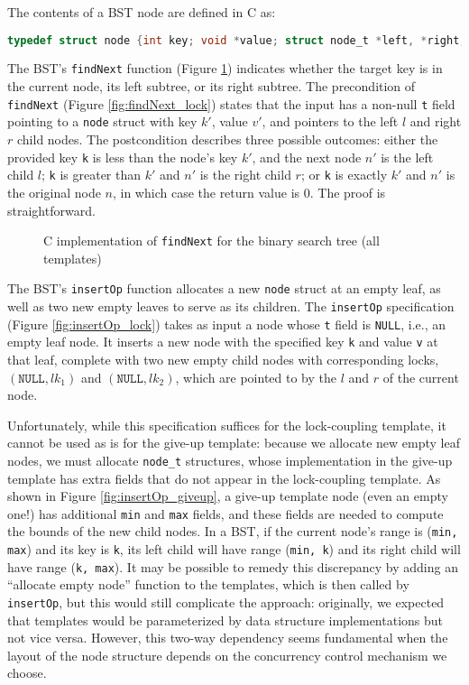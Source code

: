 \documentclass[a4paper,UKenglish,cleveref, autoref, thm-restate]{lipics-v2021}
\begin{document}
The contents of a BST node are defined in C as:
\begin{lstlisting}[language = C, backgroundcolor=\color{white}, basicstyle=\ttfamily\footnotesize]
	typedef struct node {int key; void *value; struct node_t *left, *right;} node;
\end{lstlisting}
The BST's \lstinline{findNext} function (Figure \ref{findnext}) indicates whether the target key is in the current node, its left subtree, or its right subtree. The precondition of \texttt{findNext} (Figure \ref*{fig:findNext_lock}) states that the input has a non-null \texttt{t} field pointing to a \texttt{node} struct with key $k'$, value $v'$, and pointers to the left $l$ and right $r$ child nodes. The postcondition describes three possible outcomes: either the provided key \texttt{k} is less than the node's key $k'$, and the next node $n'$ is the left child $l$; \lstinline{k} is greater than $k'$ and $n'$ is the right child $r$; or \lstinline{k} is exactly $k'$ and $n'$ is the original node $n$, in which case the return value is 0. The proof is straightforward.

\begin{figure}[ht]
	 
	\caption{C implementation of \lstinline{findNext} for the binary search tree (all templates)}
	\label{findnext}
\end{figure}

The BST's \lstinline{insertOp} function allocates a new \lstinline{node} struct at an empty leaf, as well as two new empty leaves to serve as its children. The \texttt{insertOp} specification (Figure \ref{fig:insertOp_lock}) takes as input a node whose \lstinline{t} field is \lstinline{NULL}, i.e., an empty leaf node. It inserts a new node with the specified key \texttt{k} and value \texttt{v} at that leaf, complete with two new empty child nodes with corresponding locks, $(\texttt{NULL}, \mathit{lk}_1)$ and $(\texttt{NULL}, \mathit{lk}_2)$, which are pointed to by the $l$ and $r$ of the current node.

Unfortunately, while this specification suffices for the lock-coupling template, it cannot be used as is for the give-up template: because we allocate new empty leaf nodes, we must allocate \lstinline{node_t} structures, whose implementation in the give-up template has extra fields that do not appear in the lock-coupling template. As shown in Figure \ref{fig:insertOp_giveup}, a give-up template node (even an empty one!) has additional \lstinline{min} and \lstinline{max} fields, and these fields are needed to compute the bounds of the new child nodes. In a BST, if the current node's range is (\lstinline{min, max}) and its key is \lstinline{k}, its left child will have range (\texttt{min, k}) and its right child will have range (\texttt{k, max}). It may be possible to remedy this discrepancy by adding an ``allocate empty node'' function to the templates, which is then called by \lstinline{insertOp}, but this would still complicate the approach: originally, we expected that templates would be parameterized by data structure implementations but not vice versa. However, this two-way dependency seems fundamental when the layout of the node structure depends on the concurrency control mechanism we choose.
\end{document}
